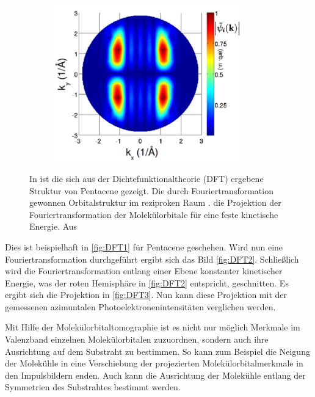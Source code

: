 \begin{figure}
\begin{subfigure}{0.3\textwidth}
                \caption{}
                \label{fig:DFT2}
            \end{subfigure}
            \begin{subfigure}{0.3\textwidth}
                \centering
                \includegraphics[width=0.9\textwidth]{./content/DFT3.PNG}
                \caption{}
                \label{fig:DFT3}
            \end{subfigure}
            \caption{In  ist die sich aus der Dichtefunktionaltheorie (DFT) ergebene Struktur von Pentacene gezeigt.
            Die durch Fouriertransformation gewonnen Orbitalstruktur im reziproken Raum .
             die Projektion der Fouriertransformation der Molekülorbitale für eine feste kinetische Energie.
            Aus~\cite{MM_2}}
            \label{fig:DFT}
        \end{figure}
        Dies ist beispielhaft in \autoref{fig:DFT1} für Pentacene geschehen.
        Wird nun eine Fouriertransformation durchgeführt ergibt sich das Bild \autoref{fig:DFT2}.
        Schließlich wird die Fouriertransformation entlang einer Ebene konstanter kinetischer Energie, was der roten Hemisphäre in \autoref{fig:DFT2} entspricht, geschnitten.
        Es ergibt sich die Projektion in \autoref{fig:DFT3}.
        Nun kann diese Projektion mit der gemessenen azimuntalen Photoelektronenintensitäten verglichen werden.

        Mit Hilfe der Molekülorbitaltomographie ist es nicht nur möglich Merkmale im Valenzband einzelnen Molekülorbitalen zuzuordnen, sondern auch ihre Ausrichtung auf dem Substraht zu bestimmen.
        So kann zum Beispiel die Neigung der Molekühle in eine Verschiebung der projezierten Molekülorbitalmerkmale in den Impulsbildern enden.
        Auch kann die Ausrichtung der Molekühle entlang der Symmetrien des Substrahtes bestimmt werden.


